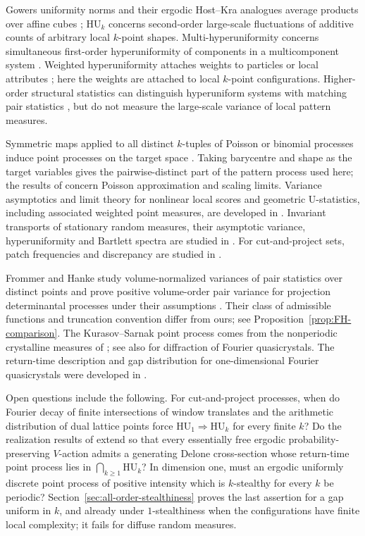 \documentclass[11pt,reqno,a4paper]{amsart}
\numberwithin{equation}{section}
\theoremstyle{compact}
\theoremstyle{definition}
\theoremstyle{definition}
\newcommand{\HU}{\mathrm{HU}}
\begin{document}
Gowers uniformity norms and their ergodic Host--Kra analogues average products
over affine cubes \cite{Gow01,HK05}; $\HU_k$ concerns second-order large-scale
fluctuations of additive counts of arbitrary local $k$-point shapes.
Multi-hyperuniformity concerns simultaneous first-order hyperuniformity of
components in a multicomponent system \cite{JLHMC14}.  Weighted hyperuniformity
attaches weights to particles or local attributes \cite{TKKCS26}; here the
weights are attached to local $k$-point configurations.  Higher-order
structural statistics can distinguish hyperuniform systems with matching pair
statistics \cite{WT23}, but do not measure the large-scale variance of local
pattern measures.

Symmetric maps applied to all distinct $k$-tuples of Poisson or binomial
processes induce point processes on the target space \cite{ST12,DST16}.
Taking barycentre and shape as the target variables gives the pairwise-distinct
part of the pattern process used here; the results of \cite{ST12,DST16} concern
Poisson approximation and scaling limits.  Variance asymptotics and limit
theory for nonlinear local scores and geometric U-statistics, including
associated weighted point measures, are developed in \cite{BYY19}.  Invariant
transports of stationary random measures, their asymptotic variance,
hyperuniformity and Bartlett spectra are studied in \cite{KLLY25}.  For
cut-and-project sets, patch frequencies and discrepancy are studied in
\cite{HJKW19}.

Frommer and Hanke study volume-normalized variances of pair statistics
over distinct points and prove positive volume-order pair variance for projection
determinantal processes under their assumptions \cite{FH26}.  Their class of admissible functions and truncation convention differ from ours; see
Proposition~\ref{prop:FH-comparison}.  
The Kurasov--Sarnak point process comes from the nonperiodic crystalline
measures of \cite{KS20}; see also \cite{AKKV25} for diffraction of Fourier
quasicrystals.  The return-time description and gap distribution for
one-dimensional Fourier quasicrystals were developed in \cite{AV24}.

Open questions include the following.  For cut-and-project processes, when do
Fourier decay of finite intersections of window translates and the arithmetic
distribution of dual lattice points force $\HU_1\Rightarrow\HU_k$ for every
finite $k$?  Do the realization results of \cite{Bjo26a,Bjo26b} extend so that
every essentially free ergodic probability-preserving $V$-action admits a
generating Delone cross-section whose return-time point process lies in
$\bigcap_{k\geq1}\HU_k$?  In dimension one, must an ergodic uniformly discrete
point process of positive intensity which is $k$-stealthy for every $k$ be
periodic?  Section~\ref{sec:all-order-stealthiness} proves the last assertion
for a gap uniform in $k$, and already under $1$-stealthiness when the
configurations have finite local complexity; it fails for diffuse random
measures.
\end{document}
